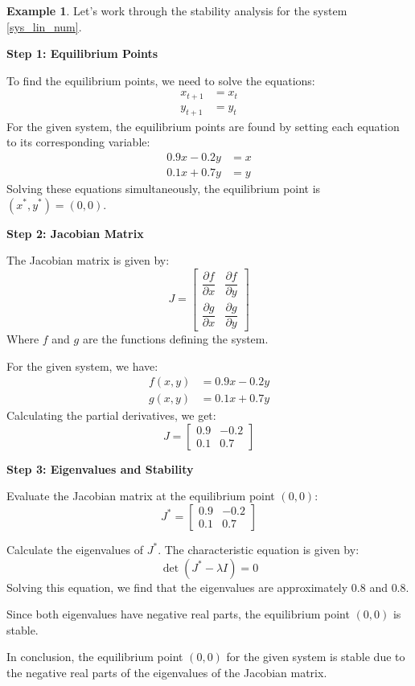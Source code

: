 \documentclass[11pt,a4paper]{book}
\theoremstyle{definition}\newtheorem{definition}{Definition}
\theoremstyle{definition}\newtheorem{fact}{Fact}
\theoremstyle{definition}\newtheorem{remark}{Remark}
\theoremstyle{definition}\newtheorem{ex}{Ex.}
\theoremstyle{definition}\newtheorem{project}{Project}
\theoremstyle{definition}\newtheorem{problem}{Problem}
\theoremstyle{definition}\newtheorem{example}{Example}
\numberwithin{theorem}{section}
\numberwithin{corollary}{chapter}
\numberwithin{assumption}{chapter}
\numberwithin{definition}{chapter}
\numberwithin{prop}{chapter}
\numberwithin{notation}{chapter}
\numberwithin{problem}{chapter}
\numberwithin{example}{chapter}
\numberwithin{fact}{chapter}
\numberwithin{ex}{chapter}
\begin{document}
	\begin{example}
		Let's work through the stability analysis for the system \eqref{sys_lin_num}.
		
		\textbf{Step 1: Equilibrium Points}
		
		To find the equilibrium points, we need to solve the equations:
		\begin{align*}
			x_{t+1} &= x_t \\
			y_{t+1} &= y_t
		\end{align*}
		For the given system, the equilibrium points are found by setting each equation to its corresponding variable:
		\begin{align*}
			0.9x - 0.2y &= x \\
			0.1x + 0.7y &= y
		\end{align*}
		Solving these equations simultaneously, the equilibrium point is \((x^*, y^*) = (0, 0)\).
		
		\textbf{Step 2: Jacobian Matrix}
		
		The Jacobian matrix is given by:
		\[
		J =
		\begin{bmatrix}
			\dfrac{\partial f}{\partial x} & \dfrac{\partial f}{\partial y} \\
			\dfrac{\partial g}{\partial x} & \dfrac{\partial g}{\partial y}
		\end{bmatrix}
		\]
		Where $f$ and $g$ are the functions defining the system.
		
		For the given system, we have:
		\begin{align*}
			f(x, y) &= 0.9x - 0.2y \\
			g(x, y) &= 0.1x + 0.7y
		\end{align*}
		Calculating the partial derivatives, we get:
		\[
		J =
		\begin{bmatrix}
			0.9 & -0.2 \\
			0.1 & 0.7
		\end{bmatrix}
		\]
		
		\textbf{Step 3: Eigenvalues and Stability}
		
		Evaluate the Jacobian matrix at the equilibrium point \((0, 0)\):
		\[
		J^* =
		\begin{bmatrix}
			0.9 & -0.2 \\
			0.1 & 0.7
		\end{bmatrix}
		\]
		
		Calculate the eigenvalues of \(J^*\). The characteristic equation is given by:
		\[
		\det(J^* - \lambda I) = 0
		\]
		Solving this equation, we find that the eigenvalues are approximately \(0.8\) and \(0.8\).
		
		Since both eigenvalues have negative real parts, the equilibrium point \((0, 0)\) is stable.
		
		In conclusion, the equilibrium point \((0, 0)\) for the given system is stable due to the negative real parts of the eigenvalues of the Jacobian matrix.
		
	\end{example}	
	
\end{document}
